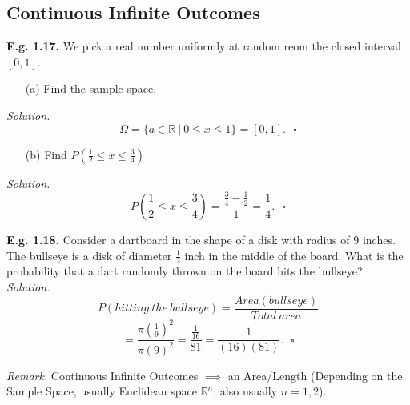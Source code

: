 \documentclass[12pt]{book}
\begin{document}
\subsection{Continuous Infinite Outcomes}
\noindent \textbf{E.g. 1.17. } We pick a real number uniformly at random reom the closed interval $[0,1]$.\\
\begin{itemize} \item[(a)] Find the sample space. \end{itemize}
\textit{Solution. }
$$\Omega = \{a\in \mathbb{R} ~|~ 0\leq x \leq 1\} = [0,1].~~~\square$$
\begin{itemize} \item[(b)] Find $P\left(\frac{1}{2} \leq x \leq \frac{3}{4}\right)$\end{itemize}
\textit{Solution. }
$$P\left(\frac{1}{2} \leq x \leq \frac{3}{4}\right) = \frac{\frac{3}{4} - \frac{1}{2}}{1} = \frac{1}{4}.~~~\square$$

\noindent \textbf{E.g. 1.18. } Consider a dartboard in the shape of a disk with radius of 9 inches. The bullseye is a disk of diameter $\frac{1}{2}$ inch in the middle of the board. What is the probability that a dart randomly thrown on the board hits the bullseye?\\
\textit{Solution. }
$$P(hitting~the~bullseye) = \frac{Area(bullseye)}{Total~area}$$
$$ = \frac{\pi \left( \frac{1}{9} \right)^2}{\pi (9)^2} = \frac{\frac{1}{16}}{81} = \frac{1}{(16)(81)}.~~~\square$$

\noindent \textit{Remark. } Continuous Infinite Outcomes $\implies{}$ an Area/Length (Depending on the Sample Space, usually Euclidean space $\mathbb{R}^n$, also usually $n=1,2$).




\end{document}
